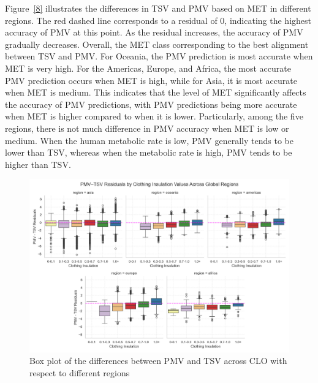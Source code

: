 \documentclass[final,3p,times,12pt]{elsarticle}
\begin{document}
Figure~\ref{8} illustrates the differences in TSV and PMV based on MET in different regions. The red dashed line corresponds to a residual of 0, indicating the highest accuracy of PMV at this point. As the residual increases, the accuracy of PMV gradually decreases. Overall, the MET class corresponding to the best alignment between TSV and PMV. For Oceania, the PMV prediction is most accurate when MET is very high. For the Americas, Europe, and Africa, the most accurate PMV prediction occurs when MET is high, while for Asia, it is most accurate when MET is medium. This indicates that the level of MET significantly affects the accuracy of PMV predictions, with PMV predictions being more accurate when MET is higher compared to when it is lower. Particularly, among the five regions, there is not much difference in PMV accuracy when MET is low or medium. When the human metabolic rate is low, PMV generally tends to be lower than TSV, whereas when the metabolic rate is high, PMV tends to be higher than TSV.

\begin{figure}[h!]
    \centering
    \includegraphics[width=1.0\linewidth]{facet_clo_residuals_new.jpg}
    \caption{Box plot of the differences between PMV and TSV across CLO with respect to different regions}
    \label{9}
\end{figure}
\end{document}
